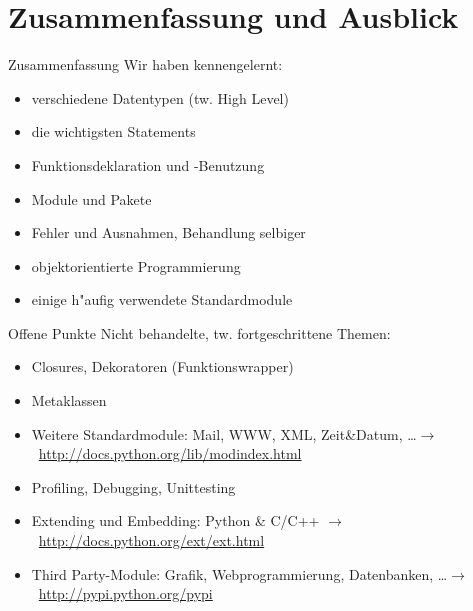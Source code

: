 \section{Zusammenfassung und Ausblick}

\begin{frame}{Zusammenfassung}
Wir haben kennengelernt:
\begin{itemize}
\item verschiedene \alert{Datentypen} (tw. \glqq High Level\grqq)
\item die wichtigsten \alert{Statements}
\item \alert{Funktion}sdeklaration und -Benutzung
\item \alert{Module} und Pakete
\item Fehler und \alert{Ausnahmen}, Behandlung selbiger
\item \alert{objektorientierte Programmierung}
\item einige h"aufig verwendete Standardmodule
\end{itemize}
\end{frame}

\begin{frame}{Offene Punkte}
Nicht behandelte, tw. fortgeschrittene Themen:
\begin{itemize}
\item Closures, Dekoratoren (Funktionswrapper)
\item Metaklassen
\item Weitere Standardmodule: Mail, WWW, XML, Zeit\&Datum, \dots $\rightarrow$~\href{http://docs.python.org/lib/modindex.html}{http://docs.python.org/lib/modindex.html}
\item Profiling, Debugging, Unittesting
\item Extending und Embedding: Python \& C/C++ $\rightarrow$~\href{http://docs.python.org/ext/ext.html}{http://docs.python.org/ext/ext.html}
\item Third Party-Module: Grafik, Webprogrammierung, Datenbanken, \dots $\rightarrow$~\href{http://pypi.python.org/pypi}{http://pypi.python.org/pypi}
\end{itemize}
\end{frame}

